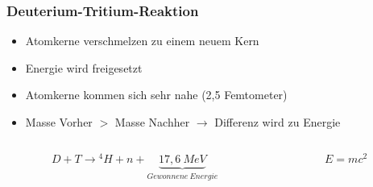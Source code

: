 \documentclass[aspectratio=169]{beamer}
\begin{document}
      \begin{frame}
        \frametitle{Deuterium-Tritium-Reaktion}
        \begin{itemize}
          \item Atomkerne verschmelzen zu einem neuem Kern
          \item Energie wird freigesetzt
          \item Atomkerne kommen sich sehr nahe (2,5 Femtometer)
          \item Masse Vorher \( > \) Masse Nachher \( \rightarrow \) Differenz wird zu Energie
        \end{itemize}
        \bigskip

        \begin{columns}[T]
          \begin{column}{0.5\textwidth}
            \begin{equation*}
              D + T \rightarrow {}^4 H + n + \underbrace{ 17,6~MeV }_{Gewonnene~Energie}
            \end{equation*}
          \end{column}
          \begin{column}{0.5\textwidth}
            \begin{equation*}
              E = mc^2
            \end{equation*}
          \end{column}
        \end{columns}
      \end{frame}
\end{document}
